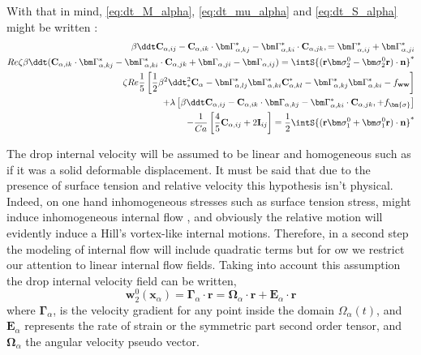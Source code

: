 With that in mind, \ref{eq:dt_M_alpha}, \ref{eq:dt_mu_alpha} and \ref{eq:dt_S_alpha} might be written :
\begin{align}
    \label{eq:dt_Cs}
    \beta \ddt \textbf{C}_{\alpha,ij}
    - \textbf{C}_{\alpha,ik} \cdot \bm\Gamma_{\alpha,kj}^*
    - \bm\Gamma_{\alpha,ki}^* \cdot \textbf{C}_{\alpha,jk},
    = 
    \bm\Gamma_{\alpha,ij}^*
    +  \bm\Gamma_{\alpha,ji}^*\\
    Re \zeta \beta \ddt( \textbf{C}_{\alpha,ik} \cdot \bm\Gamma_{\alpha,kj}^*
    -  \bm\Gamma_{\alpha,ki}^* \cdot \textbf{C}_{\alpha,jk}
    + \bm\Gamma_{\alpha,ji} - \bm\Gamma_{\alpha,ij})
    =  \intS{(\textbf{r}\bm\sigma_2^0- \bm\sigma_2^0\textbf{r})\cdot \textbf{n}}^*\\
    \zeta Re \frac{1}{5}  
    \left[
        \frac{1}{2}\beta^2 \ddt^2_* \textbf{C}_\alpha
        - \bm\Gamma_{\alpha,lj}^* \bm\Gamma_{\alpha,ki}^* \textbf{C}_{\alpha,kl}^* 
        - \bm\Gamma_{\alpha,kj}^* \bm\Gamma_{\alpha,ki}^* 
        - f_\textbf{ww}
    \right]\nonumber\\
    + \lambda \left[
        \beta \ddt \textbf{C}_{\alpha,ij}
        -\textbf{C}_{\alpha,ik} \cdot \bm\Gamma_{\alpha,kj}
        - \bm\Gamma_{\alpha,ki}^* \cdot \textbf{C}_{\alpha,jk},
        + f_{\bm{\sigma}}
    \right]\nonumber\\
    - \frac{1}{Ca}\left[
        \frac{4}{5} \textbf{C}_{\alpha,ij}
        +2 \textbf{I}_{ij} 
    \right]
    =
    \frac{1}{2}\intS{(\textbf{r}\bm\sigma_1^0+ \bm\sigma_1^0\textbf{r})\cdot \textbf{n}}^*
    \label{eq:dt2_C}
\end{align}







The drop internal velocity will be assumed to be linear and homogeneous such as if it was a solid deformable displacement. 
It must be said that due to the presence of surface tension and relative velocity this hypothesis isn't physical. 
Indeed, on one hand inhomogeneous stresses such as surface tension stress, might induce inhomogeneous internal flow \citep{goddard1967nonlinear}, and obviously the relative motion will evidently induce a Hill's vortex-like internal motions. 
Therefore, in a second step the modeling of internal flow will include quadratic terms but for ow we restrict our attention to linear internal flow fields. 
Taking into account this assumption the drop internal velocity field can be written,
\begin{equation}
    \textbf{w}_2^0(\textbf{x}_\alpha)
    = \bm\Gamma_\alpha \cdot \textbf{r}
    =\bm{\Omega}_\alpha\cdot \textbf{r}
    + \textbf{E}_\alpha \cdot \textbf{r}
    \label{eq:def_vel}
\end{equation}
where $\bm\Gamma_\alpha$, is the velocity gradient for any point inside the domain $\Omega_\alpha(t)$, and $\textbf{E}_\alpha$ represents the rate of strain or the symmetric part second order tensor, and $\bm\Omega_\alpha$ the angular velocity pseudo vector. 

